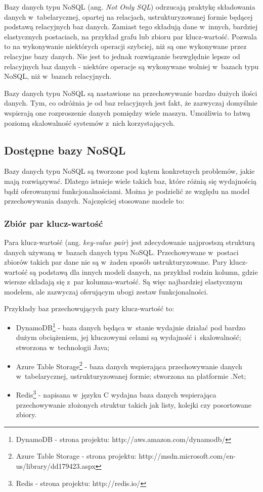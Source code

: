Bazy danych typu NoSQL (ang. \emph{Not Only SQL}) odrzucają praktykę składowania danych w~tabelarycznej, opartej na relacjach, ustrukturyzowanej formie będącej podstawą relacyjnych baz danych.
Zamiast tego składują dane w~innych, bardziej elastycznych postaciach, na przykład grafu lub zbioru par klucz-wartość.
Pozwala to na wykonywanie niektórych operacji szybciej, niż są one wykonywane przez relacyjne bazy danych.
Nie jest to jednak rozwiązanie bezwględnie lepsze od relacyjnych baz danych - niektóre operacje są wykonywane wolniej w~bazach typu NoSQL, niż w~bazach relacyjnych.

Bazy danych typu NoSQL są nastawione na przechowywanie bardzo dużych ilości danych.
Tym, co odróżnia je od baz relacyjnych jest fakt, że zazwyczaj domyślnie wspierają one rozproszenie danych pomiędzy wiele maszyn.
Umożliwia to łatwą poziomą skalowalność systemów z~nich korzystających.


\subsection{Dostępne bazy NoSQL}

Bazy danych typu NoSQL są tworzone pod kątem konkretnych problemów, jakie mają rozwiązywać.
Dlatego istnieje wiele takich baz, które różnią się wydajnością bądź oferowanymi funkcjonalnościami.
Można je podzielić ze względu na model przechowywania danych.
Najczęściej stosowane modele to:

\subsubsection{Zbiór par klucz-wartość}

Para klucz-wartość (ang. \emph{key-value pair}) jest zdecydowanie najprostszą strukturą danych używaną w~bazach danych typu NoSQL.
Przechowywane w~postaci zbiorów takich par dane nie są w~żaden sposób ustrukturyzowane.
Pary klucz-wartość są podstawą dla innych modeli danych, na przykład rodzin kolumn, gdzie wiersze składają się z~par kolumna-wartość.
Są więc najbardziej elastycznym modelem, ale zazwyczaj oferującym ubogi zestaw funkcjonalności.

Przykłady baz przechowujących pary klucz-wartość to:

\begin{itemize}
 \item DynamoDB\footnote{DynamoDB - strona projektu: http://aws.amazon.com/dynamodb/} - baza danych będąca w~stanie wydajnie działać pod bardzo dużym obciążeniem, jej kluczowymi celami są wydajność i~skalowalność; stworzona w~technologii Java;
 \item Azure Table Storage\footnote{Azure Table Storage - strona projektu: http://msdn.microsoft.com/en-us/library/dd179423.aspx} - baza danych wspierająca przechowywanie danych w~tabelarycznej, ustrukturyzowanej formie; stworzona na platformie .Net;
 \item Redis\footnote{Redis - strona projektu: http://redis.io/} - napisana w~języku C wydajna baza danych wspierająca przechowywanie złożonych struktur takich jak listy, kolejki czy posortowane zbiory.
\end{itemize}

